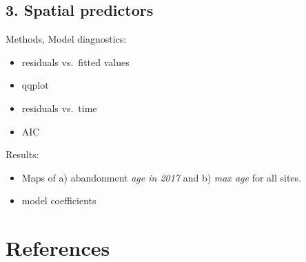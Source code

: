 \documentclass[
]{article}
\providecommand{\tightlist}{%
  \setlength{\itemsep}{0pt}\setlength{\parskip}{0pt}}
\begin{document}
\hypertarget{spatial-predictors}{%
\subsection{3. Spatial predictors}\label{spatial-predictors}}

Methods, Model diagnostics:

\begin{itemize}
\tightlist
\item
  residuals vs.~fitted values
\item
  qqplot
\item
  residuals vs.~time
\item
  AIC
\end{itemize}

Results:

\begin{itemize}
\tightlist
\item
  Maps of a) abandonment \emph{age in 2017} and b) \emph{max age} for all sites.
\item
  model coefficients
\end{itemize}

\hypertarget{references}{%
\section*{References}\label{references}}
\end{document}
